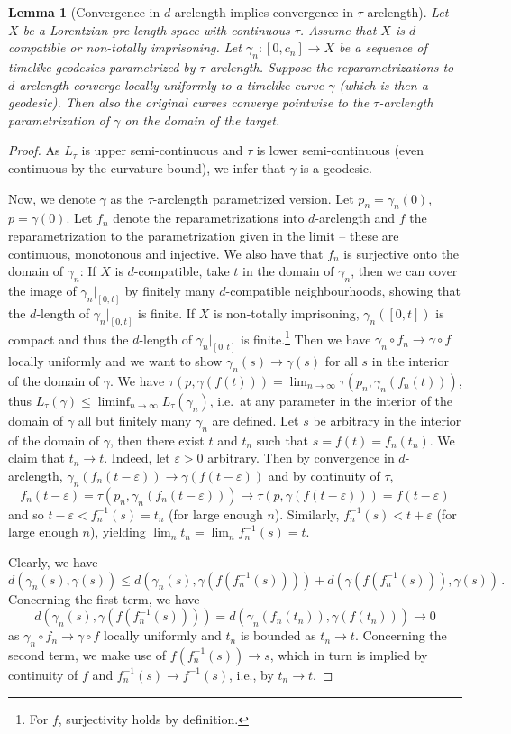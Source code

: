 \documentclass[11pt,reqno]{amsart}
\theoremstyle{definition}
\theoremstyle{definition}
\theoremstyle{plain}
\newtheorem{lem}[dfn]{Lemma}
\theoremstyle{remark}
\newcommand{\LpLS}{Lorentzian pre-length space }
\begin{document}
\begin{lem}[Convergence in $d$-arclength implies convergence in $\tau$-arclength]\label{lem:conv_d_vs_tau}
Let $X$ be a \LpLS with continuous $\tau$. Assume that $X$ is $d$-compatible or non-totally imprisoning. Let $\gamma_n:[0,c_n]\to X$ be a sequence of timelike geodesics parametrized by $\tau$-arclength. Suppose the reparametrizations to $d$-arclength converge locally uniformly to a timelike curve $\gamma$ (which is then a geodesic). Then also the original curves converge pointwise to the $\tau$-arclength parametrization of $\gamma$ on the domain of the target.
\end{lem}
\begin{proof}
As $L_{\tau}$ is upper semi-continuous and $\tau$ is lower semi-continuous (even continuous by the curvature bound), we infer that $\gamma$ is a geodesic. 

Now, we denote $\gamma$ as the $\tau$-arclength parametrized version. 
Let $p_n=\gamma_n(0)$, $p=\gamma(0)$. 
Let $f_n$ denote the reparametrizations into $d$-arclength and $f$ the reparametrization to the parametrization given in the limit  -- these are continuous, monotonous and injective. 
We also have that $f_n$ is surjective onto the domain of $\gamma_n$: If $X$ is $d$-compatible, take $t$ in the domain of $\gamma_n$, then we can cover the image of $\gamma_n|_{[0,t]}$ by finitely many $d$-compatible neighbourhoods, showing that the $d$-length of $\gamma_n|_{[0,t]}$ is finite. If $X$ is non-totally imprisoning, $\gamma_n([0,t])$ is compact and thus the $d$-length of $\gamma_n|_{[0,t]}$ is finite.\footnote{For $f$, surjectivity holds by definition.}
Then we have $\gamma_n \circ f_n \to \gamma \circ f$ locally uniformly and we want to show $\gamma_n(s) \to \gamma(s)$ for all $s$ in the interior of the domain of $\gamma$. We have $\tau(p,\gamma(f(t)))=\lim_{n\to\infty}\tau(p_n,\gamma_n(f_n(t)))$, thus $L_\tau(\gamma)\leq\liminf_{n\to\infty}L_\tau(\gamma_n)$, i.e.\ at any parameter in the interior of the domain of $\gamma$ all but finitely many $\gamma_n$ are defined. Let $s$ be arbitrary in the interior of the domain of $\gamma$, then there exist $t$ and $t_n$ such that $s=f(t)=f_n(t_n)$. 
We claim that $t_n \to t$. Indeed, let $\varepsilon > 0$ arbitrary. 
Then by convergence in $d$-arclength, $\gamma_n(f_n(t-\varepsilon))\to\gamma(f(t-\varepsilon))$ and by continuity of $\tau$,
\[f_n(t-\varepsilon)=\tau(p_n,\gamma_n(f_n(t-\varepsilon)))\to\tau(p,\gamma(f(t-\varepsilon)))=f(t-\varepsilon)\]
and so $t-\varepsilon < f_n^{-1}(s)=t_n$ (for large enough $n$). 
Similarly, $f_n^{-1}(s) < t + \varepsilon$ (for large enough $n$), yielding $\lim_n t_n=\lim_nf_n^{-1}(s) =t$. 

Clearly, we have 
\[
d(\gamma_n(s),\gamma(s)) \leq d(\gamma_n(s),\gamma(f(f_n^{-1}(s)))) + d(\gamma(f(f_n^{-1}(s))),\gamma(s)) \, .
\] 
Concerning the first term, we have 
\[d(\gamma_n(s),\gamma(f(f_n^{-1}(s)))) = d(\gamma_n(f_n(t_n)),\gamma(f(t_n))) \to 0\] 
as $\gamma_n \circ f_n \to \gamma \circ f$ locally uniformly and $t_n$ is bounded as $t_n \to t$. 
Concerning the second term, we make use of $f(f_n^{-1}(s)) \to s$, which in turn is implied by continuity of $f$ and $f_n^{-1}(s) \to f^{-1}(s)$, i.e., by $t_n \to t$. 
\end{proof}
\end{document}
